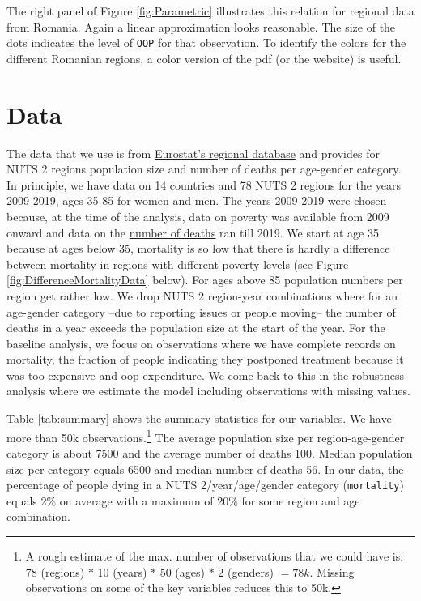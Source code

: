 \documentclass[a4paper,12pt]{article}
\begin{document}
The right panel of Figure \ref{fig:Parametric} illustrates this relation for regional data from Romania. Again a linear approximation looks reasonable. The size of the dots indicates the level of \texttt{OOP} for that observation. To identify the colors for the different Romanian regions, a color version of the pdf (or the website) is useful.



\section{Data}
\label{sec:org7725d88}

The data that we use is from \href{https://ec.europa.eu/eurostat/web/regions/data/database}{Eurostat's regional database} and provides for NUTS 2 regions population size and number of deaths per age-gender category. In principle, we have data on 14 countries and 78 NUTS 2 regions for the years 2009-2019, ages 35-85 for women and men. The years 2009-2019 were chosen  because, at the time of the analysis, data on poverty was available from 2009 onward and data on the \href{https://ec.europa.eu/eurostat/databrowser/view/demo\_r\_magec/default/table?lang=en}{number of deaths} ran till 2019. We start at age 35 because at ages below 35, mortality is so low that there is hardly a difference between mortality in regions with different poverty levels (see Figure \ref{fig:DifferenceMortalityData} below). For ages above 85 population numbers per region get rather low. We drop NUTS 2 region-year combinations where for an age-gender category --due to reporting issues or people moving-- the number of deaths in a year exceeds the population size at the start of the year. For the baseline analysis, we focus on observations where we have complete records on mortality, the fraction of people indicating they postponed treatment because it was too expensive and oop expenditure. We come back to this in the robustness analysis where we estimate the model including observations with missing values.

Table \ref{tab:summary} shows the summary statistics for our variables. We have more than 50k observations.\footnote{A rough estimate of the max. number of observations that we could have is: 78 (regions) \(*\) 10 (years) \(*\) 50 (ages) \(*\) 2 (genders) \(=78k\). Missing observations on some of the key variables reduces this to 50k.} The average population size per region-age-gender category is about 7500 and the average number of deaths 100. Median population size per category equals 6500 and median number of deaths 56. In our data, the percentage of people dying in a NUTS 2/year/age/gender category (\texttt{mortality}) equals 2\% on average with a maximum of 20\% for some region and age combination.
\end{document}

